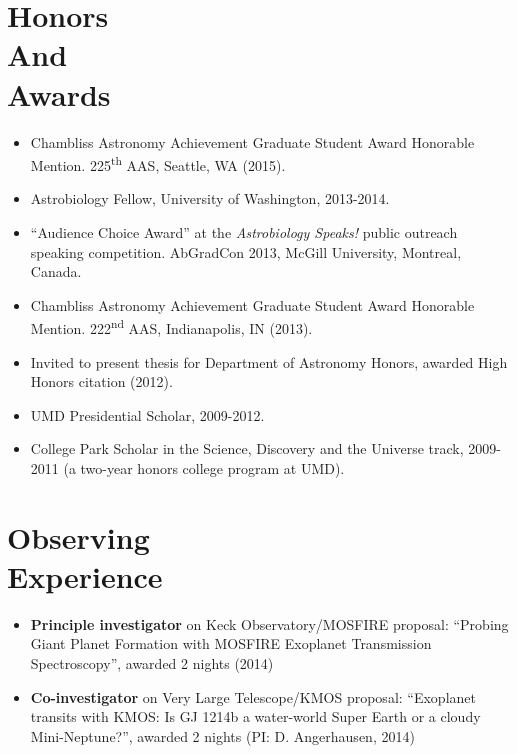 \documentclass[margin]{res}
\begin{document}
\begin{resume}
\section{Honors\\And\\Awards} 
\begin{itemize}  
\item Chambliss Astronomy Achievement Graduate Student Award Honorable Mention. 225\textsuperscript{th} AAS, Seattle, WA (2015).
 
\item Astrobiology Fellow, University of Washington, 2013-2014.

\item ``Audience Choice Award'' at the \textit{Astrobiology Speaks!} public outreach speaking competition. AbGradCon 2013, McGill University, Montreal, Canada. 

\item Chambliss Astronomy Achievement Graduate Student Award Honorable Mention. 222\textsuperscript{nd} AAS, Indianapolis, IN (2013).

\item Invited to present thesis for Department of Astronomy Honors, awarded High Honors citation (2012).

\item UMD Presidential Scholar, 2009-2012.

\item College Park Scholar in the Science, Discovery and the Universe track, 2009-2011 (a two-year honors college program at UMD). \\
\end{itemize}
                 
\section{Observing\\Experience}
\begin{itemize}   
\item {\bf Principle investigator} on Keck Observatory/MOSFIRE proposal: ``Probing Giant Planet Formation with MOSFIRE Exoplanet Transmission Spectroscopy'', awarded 2 nights (2014)

\item {\bf Co-investigator} on Very Large Telescope/KMOS proposal: ``Exoplanet transits with KMOS: Is GJ 1214b a water-world Super Earth or a cloudy Mini-Neptune?'', awarded 2 nights (PI: D. Angerhausen, 2014)


\end{itemize}
\end{resume}
\end{document}
